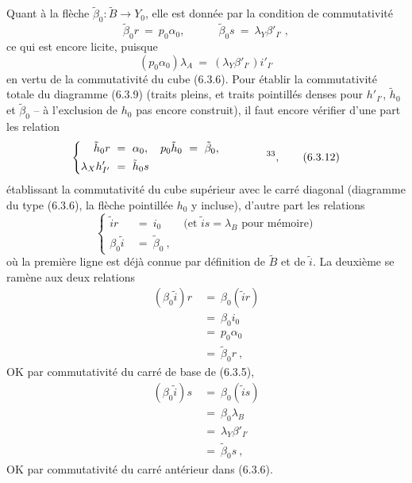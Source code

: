 \documentclass[11pt]{article}
\newcommand{\printedpage}[1]{\marginpar{\footnotesize p.~#1}}
\newcommand{\msp}[1]{\marginpar{\footnotesize [#1]}}
\begin{document}
\msp{page 114}Quant à la flèche $\tilde{\beta}_0 : \tilde{B} \longrightarrow Y_0$, elle est donnée par la condition de commutativité
\[
\tilde{\beta}_0r \ =\ p_0\alpha_0, \qquad\quad \tilde{\beta}_0s \ =\ \lambda_Y\beta'_{I'}\ ,
\tag*{(6.3.11)}
\]
ce qui est encore licite, puisque
\[
(p_0\alpha_0)\lambda_A \ =\ (\lambda_Y\beta'_{I'})i'_{I'}
\]
en vertu de la commutativité du cube (6.3.6). Pour établir la commutativité totale du diagramme (6.3.9) (traits pleins, et traits pointillés denses pour $h'_{I'}$, $\tilde{h}_0$ et $\tilde{\beta}_0$ -- à l'exclusion de $h_0$ pas encore construit), il faut encore vérifier d'une part les relation %
\[
\left\{
\begin{aligned}
\tilde{h}_0r \ &=\ \alpha_0, \quad p_0\tilde{h}_0 \ =\ \tilde{\beta}_0, \\
\lambda_X h'_{I'} \ &=\ \tilde{h}_0s
\end{aligned}
\right.
\qquad\qquad \text{\footnotemark[33]},
\tag*{(6.3.12)}
\]
établissant la commutativité du cube supérieur avec le carré diagonal (diagramme du type (6.3.6), la flèche pointillée $h_0$ y incluse), d'autre part les relations
\[
\left\{
\begin{aligned}
\tilde{i}r \ &=\ i_0 \qquad \text{(et $\tilde{i}s = \lambda_B$ pour mémoire)} \\
\beta_0\tilde{i} \ &=\ \tilde{\beta}_0\ ,
\end{aligned}
\right.
\tag*{(6.3.13)}
\]
où la première ligne est déjà connue par définition de $\tilde{B}$ et de $\tilde{i}$. La deuxième
\msp{page 115}se ramène aux deux relations
\[
\begin{aligned}
(\beta_0\tilde{i})r \ &=\ \beta_0(\tilde{i}r) \\
&=\ \beta_0i_0 \\
&=\ p_0\alpha_0 \\
&=\ \tilde{\beta}_0r\ ,
\end{aligned}
\]
OK par commutativité du carré de base de (6.3.5),
\[
\begin{aligned}
(\beta_0\tilde{i})s \ &=\ \beta_0(\tilde{i}s) \\
&=\ \beta_0\lambda_B \\
&=\ \lambda_Y\beta'_{I'} \\
&=\ \tilde{\beta}_0s\ ,
\end{aligned}
\]
\printedpage{58}
OK par commutativité du carré antérieur dans (6.3.6).
\end{document}

